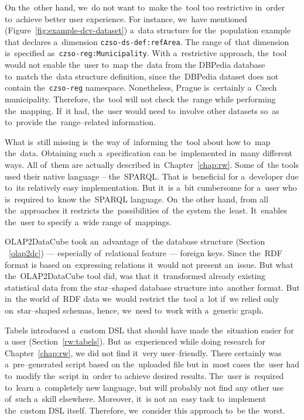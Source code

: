 \begin{sloppypar}
On the~other hand, we~do not want to~make the~tool too restrictive in~order to~achieve better user experience. For instance, we~have mentioned
(Figure~\ref{fig:example-dcv-dataset}) a~data structure 
for the~population example that declares a~dimension \texttt{czso-ds-def:refArea}. 
The range of~that dimension is~specified as~\texttt{czso-reg:Municipality}. 
With a~restrictive approach, the~tool would not enable the~user to~map the~data from 
the DBPedia database to~match the~data structure definition, since the~DBPedia 
dataset does not contain the~\texttt{czso-reg} namespace. Nonetheless, Prague is~certainly a~Czech municipality. Therefore, the~tool will not check the~range 
while performing the~mapping. If~it had, the~user would need to~involve 
other datasets so~as to~provide the~range--related information.
\end{sloppypar}

What is~still missing is~the way of~informing the~tool about how to~map the~data.
Obtaining such a~specification can be~implemented in~many different ways. 
All of~them are actually described in~Chapter~\ref{chap:rw}. Some of~the tools used 
their native language -- the~SPARQL. That is~beneficial for a~developer due to~its relatively easy implementation. But it~is a~bit cumbersome for a~user 
who is~required to~know the~SPARQL language. On~the other hand, from all the~approaches
it restricts the~possibilities of~the system the~least. It~enables the~user 
to specify a~wide range of~mappings.

OLAP2DataCube took an~advantage of~the database structure (Section ~\ref{olap2dc}) --- 
especially of~relational feature --- foreign keys. Since the~RDF format 
is based on~expressing relations it~would not present an~issue. But what the~OLAP2DataCube tool did, was that it~transformed already existing statistical data from
the star--shaped database structure into~another format. But in~the world of~RDF 
data we~would restrict the~tool a~lot if~we relied only on~star--shaped 
schemas, hence, we~need to~work with a~generic graph.

Tabels introduced a~custom DSL that should have made the~situation easier for 
a user (Section~\ref{rw:tabels}). But as~experienced while doing research for Chapter~\ref{chap:rw}, 
we did not find it~very user--friendly. There certainly was a~pre--generated script based
on the~uploaded file but in~most cases the~user had to~modify the~script in~order to
achieve desired results. The~user is~required to~learn a~completely new language, but will probably not find any other use of~such a~skill
elsewhere. Moreover, it~is not an~easy task to~implement the~custom DSL itself. Therefore, we~consider this approach to~be the~worst.

